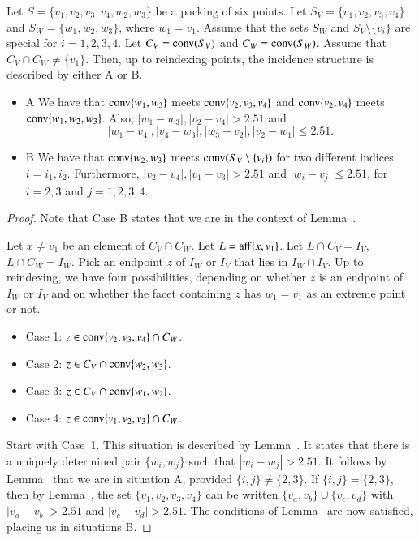 \begin{tarskidata}
\begin{tarski}
\begin{lemma}
Let $S=\{v_1,v_2,v_3,v_4,w_2,w_3\}$ be a packing of six points.
Let $S_V = \{v_1,v_2,v_3,v_4\}$ and $S_W=\{w_1,w_2,w_3\}$, where $w_1=v_1$.  
Assume
that the sets $S_W$ and $S_V\setminus\{v_i\}$ are special for
$i=1,2,3,4$.
Let $C_V={\operatorname{conv}}(S_V)$ and $C_W={\operatorname{conv}}(S_W)$.
Assume that $C_V\cap C_W\ne \{v_1\}$.
Then, up to reindexing points, the incidence structure 
is described by either A or B.
\begin{itemize}
\item{A} We have that ${\operatorname{conv}}\{w_1,w_3\}$ meets ${\operatorname{conv}}\{v_2,v_3,v_4\}$
and ${\operatorname{conv}}\{v_2,v_4\}$ meets ${\operatorname{conv}}\{w_1,w_2,w_3\}$.
Also, $|w_1-w_3|,|v_2-v_4|>2.51$ and 
  $$
  |w_1-v_4|,|v_4-w_3|,|w_3-v_2|,|v_2-w_1|\le 2.51.
  $$
\item{B} We have that ${\operatorname{conv}}\{w_2,w_3\}$ meets ${\operatorname{conv}}(S_V\setminus\{v_i\})$ for two different indices $i=i_1,i_2$.  Furthermore,
$|v_2-v_4|,|v_1-v_3|>2.51$ and 
$|w_i-v_j|\le 2.51$, for $i=2,3$ and $j=1,2,3,4$.
\end{itemize}
\end{lemma}

\begin{proof}  Note that Case B states that we are in the context
of Lemma~.

Let $x\ne v_1$ be an element of $C_V\cap C_W$.  Let $L={\operatorname{aff}}\{x,v_1\}$.
Let $L\cap C_V = I_V$, $L\cap C_W = I_W$.  Pick an endpoint $z$ of $I_W$
or $I_V$ that lies in $I_W\cap I_V$.  
Up to reindexing, we have four possibilities, depending on whether
$z$ is an endpoint of $I_W$ or $I_V$ and on whether the facet containing
$z$ has $w_1=v_1$ as an extreme point or not.
\begin{itemize}
  \item Case 1: $z\in {\operatorname{conv}}\{v_2,v_3,v_4\}\cap C_W$.
  \item Case 2: $z\in C_V \cap {\operatorname{conv}}\{w_2,w_3\}$.
  \item Case 3: $z\in C_V \cap {\operatorname{conv}}\{w_1,w_2\}$.
  \item Case 4: $z\in {\operatorname{conv}}\{v_1,v_2,v_3\}\cap C_W$.
\end{itemize}
Start with Case~1.  This situation is described by 
Lemma~.  It states that there is a uniquely
determined pair $\{w_i,w_j\}$ such that $|w_i-w_j|>2.51$.
It follows by Lemma~
that we are in situation A, provided $\{i,j\}\ne\{2,3\}$.
If $\{i,j\}=\{2,3\}$,  then by Lemma~, the
set $\{v_1,v_2,v_3,v_4\}$ can be written $\{v_a,v_b\}\cup \{v_c,v_d\}$
with $|v_a-v_b|>2.51$ and $|v_c-v_d|>2.51$.  The conditions of
Lemma~ are now satisfied, placing us in
situations B.


\end{proof}
\end{tarski}
\end{tarskidata}
